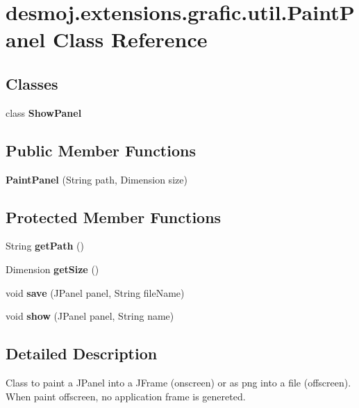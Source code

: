 \section{desmoj.\-extensions.\-grafic.\-util.\-Paint\-Panel Class Reference}
\label{classdesmoj_1_1extensions_1_1grafic_1_1util_1_1_paint_panel}
\subsection*{Classes}
\begin{DoxyCompactItemize}
\item 
class {\bfseries Show\-Panel}
\end{DoxyCompactItemize}
\subsection*{Public Member Functions}
\begin{DoxyCompactItemize}
\item 
{\bf Paint\-Panel} (String path, Dimension size)
\end{DoxyCompactItemize}
\subsection*{Protected Member Functions}
\begin{DoxyCompactItemize}
\item 
String {\bfseries get\-Path} ()\label{classdesmoj_1_1extensions_1_1grafic_1_1util_1_1_paint_panel_a389d817fb7fb43fc450398a98104bbf4}

\item 
Dimension {\bfseries get\-Size} ()\label{classdesmoj_1_1extensions_1_1grafic_1_1util_1_1_paint_panel_a1184efb452c6be662d0002addbffa496}

\item 
void {\bf save} (J\-Panel panel, String file\-Name)
\item 
void {\bf show} (J\-Panel panel, String name)
\end{DoxyCompactItemize}


\subsection{Detailed Description}
Class to paint a J\-Panel into a J\-Frame (onscreen) or as png into a file (offscreen). When paint offscreen, no application frame is genereted.

